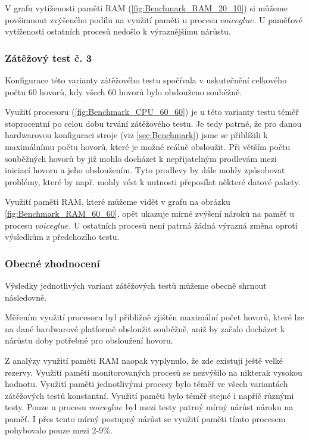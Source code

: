 \documentclass[ing,male,java,dept460]{diploma}						%
\begin{document}
V grafu vytíženosti paměti RAM (\ref{fig:Benchmark_RAM_20_10}) si můžeme povšimnout zvýšeného podílu na využití paměti u procesu $voiceglue$. U paměťové vytíženosti ostatních procesů nedošlo k výraznějšímu nárůstu.

\subsubsection{Zátěžový test č. 3}
Konfigurace této varianty zátěžového testu spočívala v uskutečnění celkového počtu 60 hovorů, kdy všech 60 hovorů bylo obslouženo souběžně.

Využití procesoru (\ref{fig:Benchmark_CPU_60_60}) je u této varianty testu téměř stoprocentní po celou dobu trvání zátěžového testu. Je tedy patrné, že pro danou hardwarovou konfiguraci stroje (viz \ref{sec:Benchmark}) jsme se přiblížili k maximálnímu počtu hovorů, které je možné reálně obsloužit. Při větším počtu souběžných hovorů by již mohlo docházet k nepřijatelným prodlevám mezi iniciací hovoru a jeho obsloužením. Tyto prodlevy by dále mohly způsobovat problémy, které by např. mohly vést k nutnosti přeposílat některé datové pakety.

Využití paměti RAM, které můžeme vidět v grafu na obrázku \ref{fig:Benchmark_RAM_60_60}, opět ukazuje mírné zvýšení nároků na paměť u procesu $voiceglue$. U ostatních procesů není patrná žádná výrazná změna oproti výsledkům z předchozího testu.


\subsubsection{Obecné zhodnocení}
Výsledky jednotlivých variant zátěžových testů můžeme obecně shrnout následovně.

Měřením využití procesoru byl přibližně zjištěn maximální počet hovorů, které lze na dané hardwarové platformě obsloužit souběžně, aniž by začalo docházet k nárůstu doby potřebné pro obsloužení hovoru.

Z analýzy využití paměti RAM naopak vyplynulo, že zde existují ještě velké rezervy. Využití paměti monitorovaných procesů se nezvýšilo na nikterak vysokou hodnotu. Využití paměti jednotlivými procesy bylo téměř ve všech variantách zátěžových testů konstantní. Využití paměti bylo téměř stejné i napříč různými testy. Pouze u procesu $voiceglue$ byl mezi testy patrný mírný nárůst nároku na paměť. I přes tento mírný postupný nárůst se využití paměti tímto procesem pohybovalo pouze mezi 2-9\%.
\end{document}
